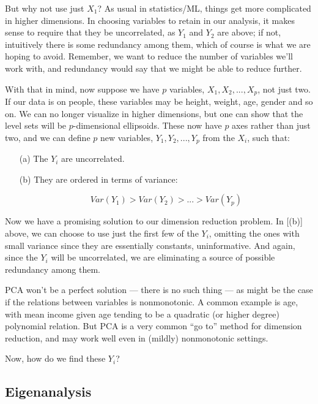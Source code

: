 But why not use just $X_1$?  As usual in statistics/ML, things get more
complicated in higher dimensions.  In choosing variables to retain in
our analysis, it makes sense to require that they be uncorrelated, as
$Y_1$ and $Y_2$ are above; if not, intuitively there is some redundancy
among them, which of course is what we are hoping to avoid.  Remember,
we want to reduce the number of variables we'll work with, and
redundancy would say that we might be able to reduce further.

With that in mind, now suppose we have $p$ variables, $X_1,
X_2,...,X_p$, not just two.  If our data is on people, these variables
may be height, weight, age, gender and so on.  We can no longer
visualize in higher dimensions, but one can show that the level sets
will be $p$-dimensional ellipsoids.  These now have $p$ axes rather than
just two, and we can define $p$ new variables, $Y_1,Y_2,...,Y_p$ from
the $X_i$, such that:

\begin{itemize}

\item [(a)] The $Y_i$ are uncorrelated.

\item [(b)] They are ordered in terms of variance:

\begin{equation}
Var(Y_1) > Var(Y_2) > ... > Var(Y_p)
\end{equation}

\end{itemize} 

Now we have a promising solution to our dimension reduction problem.  In
[(b)] above, we can choose to use just the first few of the $Y_i$,
omitting the ones with small variance since they are essentially
constants, uninformative.  And again, since the $Y_i$ will be
uncorrelated, we are eliminating a source of possible redundancy among
them.

PCA won't be a perfect solution --- there is no such thing --- as might
be the case if the relations between variables is nonmonotonic.  A
common example is age, with mean income given age tending to be a
quadratic (or higher degree) polynomial relation.  But PCA is a very
common ``go to'' method for dimension reduction, and may work well even
in (mildly) nonmonotonic settings.

Now, how do we find these $Y_i$?

\subsection{Eigenanalysis}

